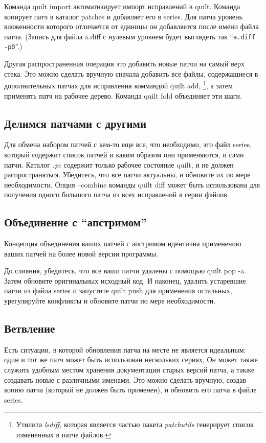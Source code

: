\documentclass{article}
\newcommand{\quilt}[1]{\textsf{quilt #1}}
\newcommand{\prog}[1]{\textit{#1}}
\begin{document}
Команда \quilt{import} автоматизирует импорт исправлений в quilt. Команда копирует патч в каталог \textsf{patches} и добавляет его в \textsf{series}. Для патча уровень вложенности которого отличается от единицы он добавляется после имени файла патча. (Запись для файла \textsf{a.diff} с нулевым уровнем будет выглядеть так ``{\small \verb|a.diff -p0|}''.)

Другая распространенная операция это добавить новые патчи на самый верх стека. Это можно сделать вручную сначала добавить все файлы, содержащиеся в дополнительных патчах для исправления коммандой \quilt{add}, \footnote{ Утилита \prog{lsdiff}, которая является частью пакета \textit{patchutils} генерирует список измененных в патче файлов.}, а затем применять патч на рабочее дерево. Команда \quilt{fold} объединяет эти шаги.

\subsection{Делимся патчами с другими}

Для обмена набором патчей с кем-то еще все, что необходимо, это файл \textsf{series}, который содержит список патчей и каким образом они применяются, и сами патчи. Каталог \textsl{.pc} содержит только рабочее состояние quilt, и не должен распространяться. Убедитесь, что все патчи актуальны, и обновите их по мере необходимости. Опция \textsf{--combine} команды \quilt{diff} может быть использована для получения одного большого патча из всех исправлений в серии файлов.

\subsection{Объединение с ``апстримом''}

Концепция объединения ваших патчей с апстримом идентична применению ваших патчей на более новой версии программы.

До слияния, убедитесь, что все ваши патчи удалены с помощью \quilt{pop -a}. Затем обновите оригинальных исходный код. И наконец, удалить устаревшие патчи из файла \textsf{series} и запустите \quilt{push} для применения остальных, урегулируйте конфликты и обновите патчи по мере необходимости.

\subsection{Ветвление}
\label{sec:forking}

Есть ситуации, в которой обновления патча на месте не является идеальным: один и тот же патч может быть использован нескольких сериях, Он может также служить удобным местом хранения документации старых версий патча, а также создавать новые с различными именами. Это можно сделать вручную, создав копию патча (который не должен быть применен), и обновить его патча в файле \textsf{series}.
\end{document}
